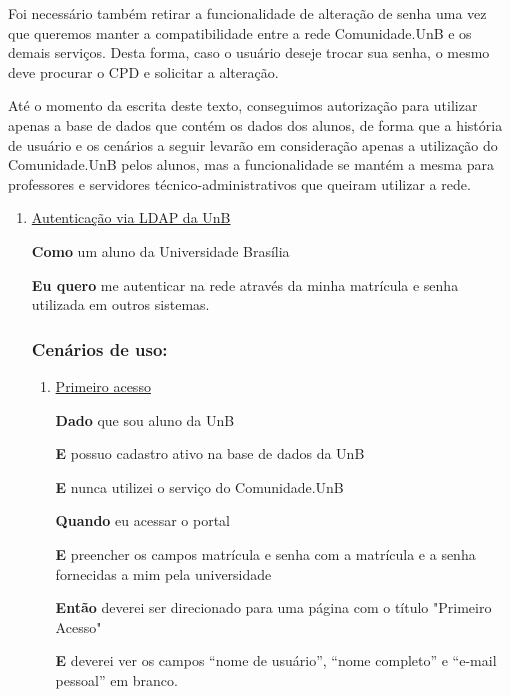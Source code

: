 Foi necessário também retirar a funcionalidade de alteração de senha uma vez
que queremos manter a compatibilidade entre a rede Comunidade.UnB
e os demais serviços. Desta forma, caso o usuário deseje trocar sua senha, o
mesmo deve procurar o CPD e solicitar a alteração.

Até o momento da escrita deste texto, conseguimos autorização para utilizar
apenas a base de dados que contém os dados dos alunos, de forma que a
história de usuário e os cenários a seguir levarão em consideração apenas
a utilização do Comunidade.UnB pelos alunos, mas a funcionalidade
se mantém a mesma para professores e servidores técnico-administrativos que
queiram utilizar a rede.

\begin{enumerate}

\item \underline{Autenticação via LDAP da UnB}

\textbf{Como} um aluno da Universidade Brasília

\textbf{Eu quero} me autenticar na rede através da minha matrícula e senha
utilizada em outros sistemas.

\subsubsection*{Cenários de uso:}

\begin{enumerate}

\item \underline{Primeiro acesso}

\textbf{Dado} que sou aluno da UnB

\textbf{E} possuo cadastro ativo na base de dados da UnB

\textbf{E} nunca utilizei o serviço do Comunidade.UnB

\textbf{Quando} eu acessar o portal

\textbf{E} preencher os campos matrícula e senha com a matrícula e a senha
fornecidas a mim pela universidade

\textbf{Então} deverei ser direcionado para uma página com o título
"Primeiro Acesso"

\textbf{E} deverei ver os campos ``nome de usuário'', ``nome completo'' e
``e-mail pessoal'' em branco.


\end{enumerate}
\end{enumerate}
